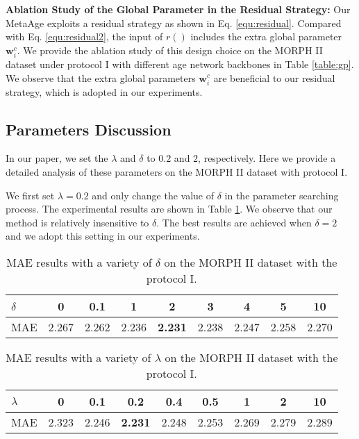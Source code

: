 \documentclass[journal,twoside]{IEEEtran}
\begin{document}
\textbf{Ablation Study of the Global Parameter in the Residual Strategy:}
Our MetaAge exploits a residual strategy as shown in Eq. \eqref{equ:residual}. Compared with Eq. \eqref{equ:residual2}, the input of $r()$ includes the extra global parameter $\bm{w}^c_i$.  We provide the ablation study of this design choice on the MORPH II dataset under protocol I with different age network backbones in Table \ref{table:gp}.  We observe that the extra global parameters $\bm{w}^c_i$ are beneficial to our residual strategy, which is adopted in our experiments.










\subsection{Parameters Discussion}

In our paper, we set the $\lambda$ and $\delta$ to $0.2$ and $2$, respectively. Here we provide a detailed analysis of these parameters on the MORPH II dataset with protocol I.

We first set $\lambda = 0.2$ and only change the value of $\delta$ in the parameter searching process. The experimental results are shown in Table \ref{table:delta}. We observe that our method is relatively insensitive to $\delta$. The best results are achieved when $\delta = 2$ and we adopt this setting in our experiments.

\begin{table}[t]
  \caption{MAE results with a variety of $\delta$ on the MORPH II dataset with the protocol I.}
  \label{table:delta}
  \renewcommand\tabcolsep{5pt}
  \centering
  \begin{tabular}{l|cccccccc}
  \toprule
  $\delta$ & 0 & 0.1 & 1 & 2 & 3 & 4 & 5  & 10   \\
  \midrule
  MAE & 2.267 & 2.262 & 2.236 & \textbf{2.231} & 2.238 & 2.247 & 2.258 & 2.270 \\
  \bottomrule
  \end{tabular}
\end{table}

\begin{table}[t]
\caption{MAE results with a variety of $\lambda$ on the MORPH II dataset with the protocol I.}
\label{table:lambda}
\renewcommand\tabcolsep{5pt}
\centering
\begin{tabular}{l|cccccccc}
\toprule
$\lambda$ & 0 & 0.1  &  0.2 & 0.4 & 0.5 & 1 & 2 &10    \\
\midrule
MAE & 2.323 & 2.246 & \textbf{2.231} & 2.248 &  2.253 & 2.269 & 2.279 & 2.289 \\
\bottomrule
\end{tabular}
\end{table}
\end{document}
